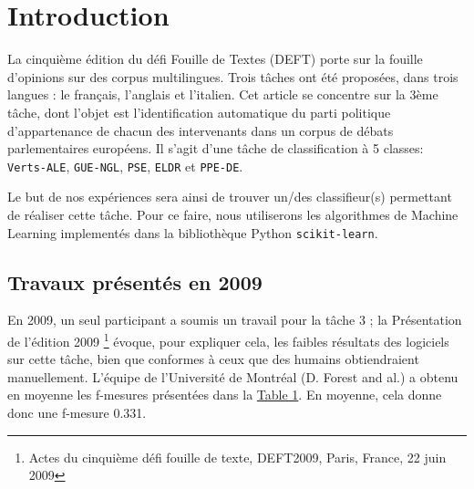 \section{Introduction}

\par La cinquième édition du défi Fouille de Textes (DEFT) porte sur la fouille d'opinions sur des corpus multilingues. Trois tâches ont été proposées, dans trois langues : le français, l'anglais et l'italien. Cet article se concentre sur la 3ème tâche, dont l'objet est l'identification automatique du parti politique d'appartenance de chacun des intervenants dans un corpus de débats parlementaires européens. Il s'agit d'une tâche de classification à 5 classes: \texttt{Verts-ALE}, \texttt{GUE-NGL}, \texttt{PSE}, \texttt{ELDR} et \texttt{PPE-DE}.

\par Le but de nos expériences sera ainsi de trouver un/des classifieur(s) permettant de réaliser cette tâche. Pour ce faire, nous utiliserons les algorithmes de Machine Learning implementés dans la bibliothèque Python \texttt{scikit-learn}.

\subsection{Travaux présentés en 2009}




\begin{table}[h!]
\centering
\setlength{\tabcolsep}{5pt} %
\renewcommand{\arraystretch}{1.2} %
\caption{Moyennes des F-mesures par parti politique.}
\label{tab:moyennes_fmesures}
\end{table}


\par En 2009, un seul participant a soumis un travail pour la tâche 3 ; la Présentation de l'édition 2009 \footnote{Actes du cinquième défi fouille de texte, DEFT2009, Paris, France, 22 juin 2009} évoque, pour expliquer cela, les faibles résultats des logiciels sur cette tâche, bien que conformes à ceux que des humains obtiendraient manuellement. L'équipe de l'Université de Montréal (D. Forest and al.) a obtenu en moyenne les f-mesures présentées dans la \hyperref[tab:moyennes_fmesures]{Table 1}. En moyenne, cela donne donc une f-mesure 0.331.

